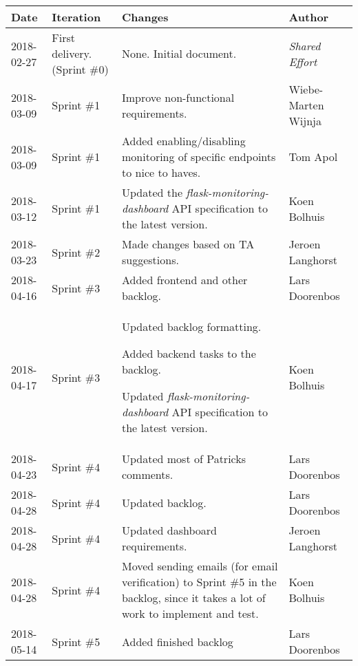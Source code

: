 \documentclass[12pt]{article}
\begin{document}
\begin{longtable}[width=\pagewidth]{@{}llp{6cm}l@{}}
\textbf{Date} & \textbf{Iteration} & \textbf{Changes} &
\textbf{Author}\tabularnewline
\endhead
2018-02-27 & First delivery. (Sprint \#0) & None. Initial document. &
\emph{Shared Effort}\tabularnewline
2018-03-09 & Sprint \#1 & Improve non-functional requirements. &
Wiebe-Marten Wijnja\tabularnewline
2018-03-09 & Sprint \#1 & Added enabling/disabling monitoring of
specific endpoints to nice to haves. & Tom Apol\tabularnewline
2018-03-12 & Sprint \#1 & Updated the \emph{flask-monitoring-dashboard}
API specification to the latest version. & Koen Bolhuis\tabularnewline
2018-03-23 & Sprint \#2 & Made changes based on TA suggestions. & Jeroen
Langhorst\tabularnewline
2018-04-16 & Sprint \#3 & Added frontend and other backlog. & Lars
Doorenbos\tabularnewline
\begin{minipage}[t]{0.22\columnwidth}\raggedright
2018-04-17\strut
\end{minipage} & \begin{minipage}[t]{0.22\columnwidth}\raggedright
Sprint \#3\strut
\end{minipage} & \begin{minipage}[t]{0.22\columnwidth}\raggedright
Updated backlog formatting.

Added backend tasks to the backlog.

Updated \emph{flask-monitoring-dashboard} API specification to the
latest version.\strut
\end{minipage} & \begin{minipage}[t]{0.22\columnwidth}\raggedright
Koen Bolhuis\strut
\end{minipage}\tabularnewline
2018-04-23 & Sprint \#4 & Updated most of Patricks comments. & Lars
Doorenbos\tabularnewline
2018-04-28 & Sprint \#4 & Updated backlog. & Lars
Doorenbos\tabularnewline
2018-04-28 & Sprint \#4 & Updated dashboard requirements. & Jeroen
Langhorst\tabularnewline
2018-04-28 & Sprint \#4 & Moved sending emails (for email verification)
to Sprint \#5 in the backlog, since it takes a lot of work to implement
and test. & Koen Bolhuis\tabularnewline
2018-05-14 & Sprint \#5 & Added finished backlog & Lars
Doorenbos\tabularnewline

\end{longtable}
\end{document}

